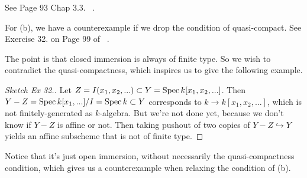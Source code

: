 See Page 93 Chap 3.3. ~\cite{kriz2021introduction}.

For (b), we have a counterexample if we drop the condition of quasi-compact. See Exercise 32. on Page 99 of ~\cite{kriz2021introduction}. 

The point is that closed immersion is always of finite type. So we wish to contradict the quasi-compactness, which inspires us to give the following example. 
\begin{proof}[Sketch Ex 32.]
    Let $Z=I(x_1,x_2,...)\subset Y=\operatorname{Spec} k[x_1,x_2,...]$. Then $Y-Z=\operatorname{Spec} k[x_1,...]/I=\operatorname{Spec} k \subset Y$ corresponds to $k\to k[x_1,x_2,...]$, which is not finitely-generated as $k$-algebra. But we're not done yet, because we don't know if $Y-Z$ is affine or not. Then taking pushout of two copies of $Y-Z\hookrightarrow Y$ yields an affine subscheme that is not of finite type. 
\end{proof} 
Notice that it's just open immersion, without necessarily the quasi-compactness condition, which gives us a counterexample when relaxing the condition of (b).